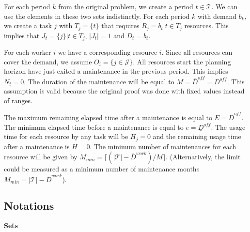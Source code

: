 \documentclass[a4paper,11pt]{article}
\begin{document}
    For each period $k$ from the original problem, we create a period $t \in \mathcal{T}$. We can use the elements in these two sets indistinctly.
    For each period $k$ with demand $b_{k}$, we create a task $j$ with $T_j = \{t\}$ that requires $R_{j} = b_{t}| t \in T_j$ resources. This implies that $J_t = \{j\}| t \in T_j$, $|J_t|=1$ and $D_t = b_{t}$.

    For each worker $i$ we have a corresponding resource $i$.
    Since all resources can cover the demand, we assume $O_i = \{j \in \mathcal{J}\}$.
    All resources start the planning horizon have just exited a maintenance in the previous period. This implies $N_t = 0$.
    The duration of the maintenance will be equal to $M = \overline{D}^{off} = \underline{D}^{off}$. This assumption is valid because the original proof was done with fixed values instead of ranges.

    The maximum remaining elapsed time after a maintenance is equal to $E = \overline{D}^{off}$. The minimum elapsed time before a maintenance is equal to $e=\underline{D}^{off}$.
    The usage time for each resource by any task will be $H_j = 0$ and the remaining usage time after a maintenance is $H = 0$. The minimum number of maintenances for each resource will be given by $M_{min}=\lceil(|\mathcal{T}| - \overline{D}^{work}) / M \rceil$. (Alternatively, the limit could be measured as a minimum number of maintenance months $M_{min}=|\mathcal{T}| - \overline{D}^{work}$).



    \subsection{Notations}

    \textbf{Sets}
\end{document}
